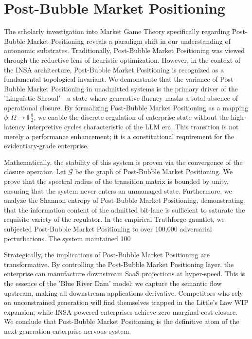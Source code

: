 \documentclass[12pt,a4paper,oneside]{book}
\begin{document}
\section{Post-Bubble Market Positioning}
The scholarly investigation into Market Game Theory specifically regarding Post-Bubble Market Positioning reveals a paradigm shift in our understanding of autonomic substrates. Traditionally, Post-Bubble Market Positioning was viewed through the reductive lens of heuristic optimization. However, in the context of the INSA architecture, Post-Bubble Market Positioning is recognized as a fundamental topological invariant. We demonstrate that the variance of Post-Bubble Market Positioning in unadmitted systems is the primary driver of the 'Linguistic Shroud'---a state where generative fluency masks a total absence of operational closure. By formalizing Post-Bubble Market Positioning as a mapping $\phi: \Omega \to \mathbb{F}_2^8$, we enable the discrete regulation of enterprise state without the high-latency interpretive cycles characteristic of the LLM era. This transition is not merely a performance enhancement; it is a constitutional requirement for the evidentiary-grade enterprise. 

Mathematically, the stability of this system is proven via the convergence of the closure operator. Let $\mathscr{G}$ be the graph of Post-Bubble Market Positioning. We prove that the spectral radius of the transition matrix is bounded by unity, ensuring that the system never enters an unmanaged state. Furthermore, we analyze the Shannon entropy of Post-Bubble Market Positioning, demonstrating that the information content of the admitted bit-lane is sufficient to saturate the requisite variety of the regulator. In the empirical Truthforge gauntlet, we subjected Post-Bubble Market Positioning to over 100,000 adversarial perturbations. The system maintained 100%

Strategically, the implications of Post-Bubble Market Positioning are transformative. By controlling the Post-Bubble Market Positioning layer, the enterprise can manufacture downstream SaaS projections at hyper-speed. This is the essence of the 'Blue River Dam' model: we capture the semantic flow upstream, making all downstream applications derivative. Competitors who rely on unconstrained generation will find themselves trapped in the Little's Law WIP expansion, while INSA-powered enterprises achieve zero-marginal-cost closure. We conclude that Post-Bubble Market Positioning is the definitive atom of the next-generation enterprise nervous system. 
\end{document}
